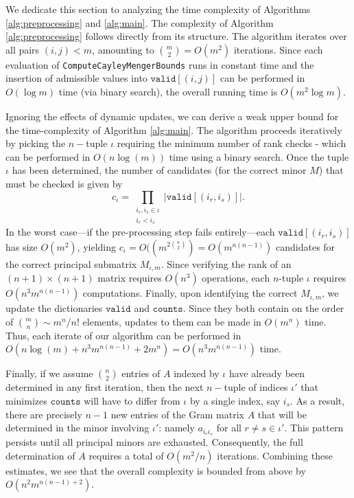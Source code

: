 \documentclass{article}
\theoremstyle{definition}
\renewcommand{\|}{|}
\newcommand{\valid}{\texttt{valid}}
\newcommand{\counts}{\texttt{counts}}
\begin{document}
We dedicate this section to analyzing the time complexity of Algorithms \ref{alg:preprocessing} and \ref{alg:main}. The complexity of Algorithm \ref{alg:preprocessing} follows directly from its structure. The algorithm iterates over all pairs $(i,j)<m$, amounting to $\binom{m}{2}=O(m^2)$ iterations. Since each evaluation of \texttt{ComputeCayleyMengerBounds} runs in constant time and the insertion of admissible values into $\valid[(i,j)]$ can be performed in $O(\log m)$ time (via binary search), the overall running time is $O(m^2\log m)$. 

Ignoring the effects of dynamic updates, we can derive a weak upper bound for the time-complexity of Algorithm \ref{alg:main}. The algorithm proceeds iteratively by picking the $n-$tuple $\iota$ requiring the minimum number of rank checks - which can be performed in $O(n\log(m))$ time using a binary search. Once the tuple $\iota$ has been determined, the number of candidates (for the correct minor $M$) that must be checked is given by
$$c_{\iota} = \prod_{\substack{i_r, i_s \in \iota \\ i_r < i_s}} |\valid[(i_r, i_s)]|.$$ In the worst case—if the pre-processing step fails entirely—each $\valid[(i_r,i_s)]$ has size $O(m^2)$, yielding $c_\iota = O((m^{2{\binom{n}{2}}}) = O(m^{n(n-1)})$ candidates for the correct principal submatrix $M_{\iota, m}$. Since verifying the rank of an $(n+1)\times(n+1)$ matrix requires $O(n^3)$ operations, each $n$-tuple $\iota$ requires $O(n^3 m^{n(n-1)})$ computations. Finally, upon identifying the correct $M_{\iota, m}$, we update the dictionaries $\valid$ and $\counts$. Since they both contain on the order of $\binom{m}{n} \sim m^n/n!$ elements, updates to them can be made in $O(m^n)$ time. Thus, each iterate of our algorithm can be performed in $O(n\log(m) + n^3m^{n(n-1)} + 2m^n) = O(n^3m^{n(n-1)})$ time.

Finally, if we assume $\binom{n}{2}$ entries of $A$ indexed by $\iota$ have already been determined in any first iteration, then the next $n-$tuple of indices $\iota'$ that minimizes $\counts$ will have to differ from $\iota$ by a single index, say $i_s$. As a result, there are precisely $n-1$ new entries of the Gram matrix $A$ that will be determined in the minor involving $\iota'$: namely $a_{i_ri_s}$ for all $r\neq s \in \iota'$. This pattern persists until all principal minors are exhausted. Consequently, the full determination of $A$ requires a total of $O(m^2/n)$ iterations. Combining these estimates, we see that the overall complexity is bounded from above by $O(n^2m^{n(n-1)+2})$. \\
\end{document}
